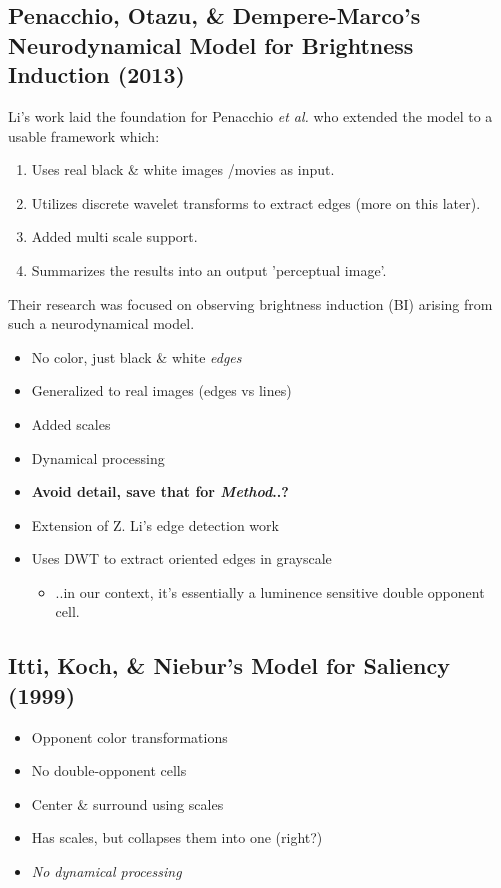 \documentclass[journal,onecolumn]{IEEEtran}
\begin{document}
\subsection*{Penacchio, Otazu, \& Dempere-Marco's Neurodynamical Model for Brightness Induction (2013)}
Li's work laid the foundation for Penacchio \textit{et al.} who extended the model to a usable framework which:
\begin{enumerate}
    \item Uses real black \& white images /movies as input.
    \item Utilizes discrete wavelet transforms to extract edges (more on this later).
    \item Added multi scale support.
    \item Summarizes the results into an output 'perceptual image'.
\end{enumerate}
Their research was focused on observing brightness induction (BI) arising from such a neurodynamical model.
\begin{itemize}
    \item No color, just black \& white \textit{edges}
    \item Generalized to real images (edges vs lines)
    \item Added scales
    \item Dynamical processing
    \item \textbf{Avoid detail, save that for \textit{Method}..?}
    \item Extension of Z. Li's edge detection work
    \item Uses DWT to extract oriented edges in grayscale
    \begin{itemize}
        \item ..in our context, it's essentially a luminence sensitive double opponent cell.
    \end{itemize}
\end{itemize}


\subsection*{Itti, Koch, \& Niebur's Model for Saliency (1999)}
\begin{itemize}
    \item Opponent color transformations
    \item No double-opponent cells
    \item Center \& surround using scales
    \item Has scales, but collapses them into one (right?)
    \item \textit{No dynamical processing}
\end{itemize}
\end{document}
